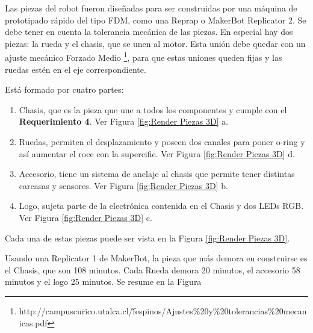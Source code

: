 Las piezas del robot fueron diseñadas para ser construidas por una máquina de prototipado rápido del tipo FDM, como una Reprap o MakerBot Replicator 2. Se debe tener en cuenta la tolerancia mecánica de las piezas. En especial hay dos piezas: la rueda y el chasis, que se unen al motor. Esta unión debe quedar con un ajuste mecánico Forzado Medio \footnote{http://campuscurico.utalca.cl/\~ fespinos/Ajustes\%20y\%20tolerancias\%20mecanicas.pdf}, para que estas uniones queden fijas y las ruedas estén en el eje correspondiente.

Está formado por cuatro partes:

\begin{enumerate}
\item Chasis, que es la pieza que une a todos los componentes y cumple con el \textbf{Requerimiento 4}. Ver Figura \ref{fig:Render Piezas 3D} a.
\item Ruedas, permiten el desplazamiento y poseen dos canales para poner o-ring y así aumentar el roce con la supercifie. Ver Figura \ref{fig:Render Piezas 3D} d.
\item Accesorio, tiene un sistema de anclaje al chasis que permite tener distintas carcasas y sensores. Ver Figura \ref{fig:Render Piezas 3D} b.
\item Logo,  sujeta parte de la electrónica contenida en el Chasis y dos LEDs RGB. Ver Figura \ref{fig:Render Piezas 3D} c.
\end{enumerate}

Cada una de estas piezas puede ser vista en la Figura \ref{fig:Render Piezas 3D}.

Usando una Replicator 1 de MakerBot, la pieza que más demora en construirse es el Chasis, que son 108 minutos. Cada Rueda demora 20 minutos, el accesorio 58 minutos y el logo 25 minutos. Se resume en la Figura

